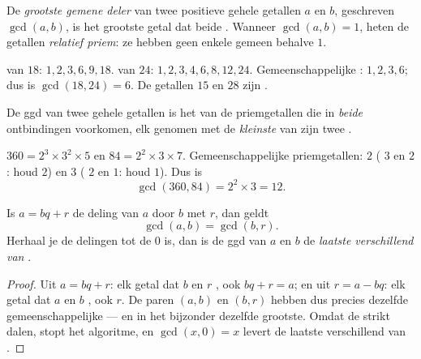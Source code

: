 \begin{definition}[ggd]\label{def:g9:arith:gcd}
De \emph{grootste gemene deler} van twee positieve
gehele getallen $a$ en $b$, geschreven $\gcd(a, b)$, is het grootste getal dat
beide . Wanneer $\gcd(a, b) = 1$, heten de getallen \emph{relatief
priem}: ze hebben geen enkele  gemeen behalve $1$.
\end{definition}

\begin{example}
 van $18$: $1, 2, 3, 6, 9, 18$.  van $24$: $1, 2, 3, 4, 6, 8, 12,
24$. Gemeenschappelijke : $1, 2, 3, 6$; dus is $\gcd(18, 24) = 6$. De
getallen $15$ en $28$ zijn .
\end{example}

\begin{proposition}\label{prop:g9:arith:gcdfact}
De ggd van twee gehele getallen is het  van de priemgetallen die in
\emph{beide} ontbindingen voorkomen, elk genomen met de \emph{kleinste} van zijn
twee .
\end{proposition}
\admitted

\begin{example}\label{ex:g9:arith:gcdfact}
$360 = 2^3 \times 3^2 \times 5$ en $84 = 2^2 \times 3 \times 7$.
Gemeenschappelijke priemgetallen: $2$ ( $3$ en $2$: houd $2$) en $3$
( $2$ en $1$: houd $1$). Dus is
\[
\gcd(360, 84) = 2^2 \times 3 = 12 .
\]
\end{example}

\begin{theorem}\label{thm:g9:arith:euclidalgo}
Is $a = bq + r$ de deling van $a$ door $b$ met  $r$, dan geldt
\[
\gcd(a, b) = \gcd(b, r).
\]
Herhaal je de delingen tot de  $0$ is, dan is de ggd van $a$ en $b$ de
\emph{laatste  verschillend van }.
\end{theorem}

\begin{proof}
Uit $a = bq + r$: elk getal dat $b$ en $r$ ,  ook $bq + r = a$; en uit
$r = a - bq$: elk getal dat $a$ en $b$ ,  ook $r$. De paren $(a, b)$ en
$(b, r)$ hebben dus precies dezelfde gemeenschappelijke  --- en in het
bijzonder dezelfde grootste. Omdat de  strikt dalen, stopt het algoritme, en
$\gcd(x, 0) = x$ levert de laatste  verschillend van .
\end{proof}

